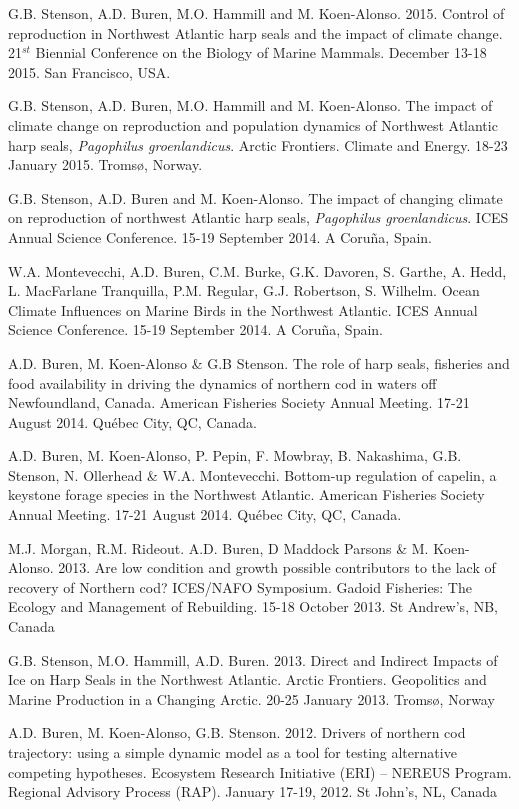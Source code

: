 \documentclass{res}
\begin{document}
\begin{resume}
\begin{hangparas}{.4in}{1}
G.B. Stenson, A.D. Buren, M.O. Hammill and M. Koen-Alonso. 2015. Control of reproduction in Northwest Atlantic harp seals and the impact of climate change. 21$^{st}$ Biennial Conference on the Biology of Marine Mammals. December 13-18 2015. San Francisco, USA.

G.B. Stenson, A.D. Buren, M.O. Hammill and M. Koen-Alonso. The impact of climate change on reproduction and population dynamics of Northwest Atlantic harp seals, \textit{Pagophilus groenlandicus}. Arctic Frontiers. Climate and Energy. 18-23 January 2015. Troms{\o}, Norway.

G.B. Stenson, A.D. Buren and M. Koen-Alonso. The impact of changing climate on reproduction of northwest Atlantic harp seals, \textit{Pagophilus groenlandicus}. ICES Annual Science Conference. 15-19 September 2014. A Coru\~{n}a, Spain.

W.A. Montevecchi, A.D. Buren, C.M. Burke, G.K. Davoren, S. Garthe, A. Hedd, L. MacFarlane Tranquilla, P.M. Regular, G.J. Robertson, S. Wilhelm. Ocean Climate Influences on Marine Birds in the Northwest Atlantic. ICES Annual Science Conference. 15-19 September 2014. A Coru\~{n}a, Spain.

A.D. Buren, M. Koen-Alonso \& G.B Stenson. The role of harp seals, fisheries and food availability in driving the dynamics of northern cod in waters off Newfoundland, Canada. American Fisheries Society Annual Meeting. 17-21 August 2014. Qu\'{e}bec City, QC, Canada.

A.D. Buren, M. Koen-Alonso, P. Pepin, F. Mowbray, B. Nakashima, G.B. Stenson, N. Ollerhead \& W.A. Montevecchi. Bottom-up regulation of capelin, a keystone forage species in the Northwest Atlantic. American Fisheries Society Annual Meeting. 17-21 August 2014. Qu\'{e}bec City, QC, Canada.

M.J. Morgan, R.M. Rideout. A.D. Buren, D Maddock Parsons \& M. Koen-Alonso. 2013. Are low condition and growth possible contributors to the lack of recovery of Northern cod? ICES/NAFO Symposium. Gadoid Fisheries: The Ecology and Management of Rebuilding. 15-18 October 2013. St Andrew's, NB, Canada

G.B. Stenson, M.O. Hammill, A.D. Buren. 2013. Direct and Indirect Impacts of Ice on Harp Seals in the Northwest Atlantic. Arctic Frontiers. Geopolitics and Marine Production in a Changing Arctic. 20-25 January 2013. Troms{\o}, Norway

A.D. Buren, M. Koen-Alonso, G.B. Stenson. 2012. Drivers of northern cod trajectory: using a simple dynamic model as a tool for testing alternative competing hypotheses. Ecosystem Research Initiative (ERI) – NEREUS Program. Regional Advisory Process (RAP). January 17-19, 2012. St John's, NL, Canada


\end{hangparas}
\end{resume}
\end{document}
